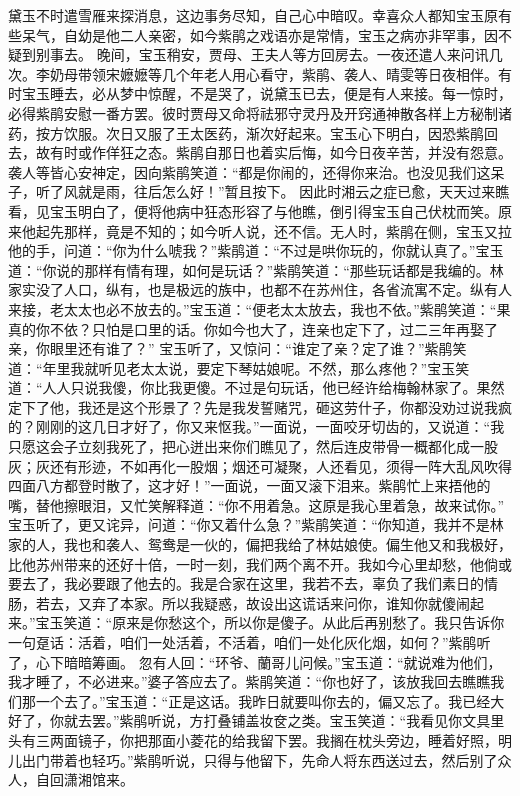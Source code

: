 \documentclass[12pt,oneside]{book}
\begin{document}
黛玉不时遣雪雁来探消息，这边事务尽知，自己心中暗叹。幸喜众人都知宝玉原有些呆气，自幼是他二人亲密，如今紫鹃之戏语亦是常情，宝玉之病亦非罕事，因不疑到别事去。
晚间，宝玉稍安，贾母、王夫人等方回房去。一夜还遣人来问讯几次。李奶母带领宋嬷嬷等几个年老人用心看守，紫鹃、袭人、晴雯等日夜相伴。有时宝玉睡去，必从梦中惊醒，不是哭了，说黛玉已去，便是有人来接。每一惊时，必得紫鹃安慰一番方罢。彼时贾母又命将祛邪守灵丹及开窍通神散各样上方秘制诸药，按方饮服。次日又服了王太医药，渐次好起来。宝玉心下明白，因恐紫鹃回去，故有时或作佯狂之态。紫鹃自那日也着实后悔，如今日夜辛苦，并没有怨意。袭人等皆心安神定，因向紫鹃笑道：“都是你闹的，还得你来治。也没见我们这呆子，听了风就是雨，往后怎么好！”暂且按下。
因此时湘云之症已愈，天天过来瞧看，见宝玉明白了，便将他病中狂态形容了与他瞧，倒引得宝玉自己伏枕而笑。原来他起先那样，竟是不知的；如今听人说，还不信。无人时，紫鹃在侧，宝玉又拉他的手，问道：“你为什么唬我？”紫鹃道：“不过是哄你玩的，你就认真了。”宝玉道：“你说的那样有情有理，如何是玩话？”紫鹃笑道：“那些玩话都是我编的。林家实没了人口，纵有，也是极远的族中，也都不在苏州住，各省流寓不定。纵有人来接，老太太也必不放去的。”宝玉道：“便老太太放去，我也不依。”紫鹃笑道：“果真的你不依？只怕是口里的话。你如今也大了，连亲也定下了，过二三年再娶了亲，你眼里还有谁了？”
宝玉听了，又惊问：“谁定了亲？定了谁？”紫鹃笑道：“年里我就听见老太太说，要定下琴姑娘呢。不然，那么疼他？”宝玉笑道：“人人只说我傻，你比我更傻。不过是句玩话，他已经许给梅翰林家了。果然定下了他，我还是这个形景了？先是我发誓赌咒，砸这劳什子，你都没劝过说我疯的？刚刚的这几日才好了，你又来怄我。”一面说，一面咬牙切齿的，又说道：“我只愿这会子立刻我死了，把心迸出来你们瞧见了，然后连皮带骨一概都化成一股灰；灰还有形迹，不如再化一股烟；烟还可凝聚，人还看见，须得一阵大乱风吹得四面八方都登时散了，这才好！”一面说，一面又滚下泪来。紫鹃忙上来捂他的嘴，替他擦眼泪，又忙笑解释道：“你不用着急。这原是我心里着急，故来试你。”
宝玉听了，更又诧异，问道：“你又着什么急？”紫鹃笑道：“你知道，我并不是林家的人，我也和袭人、鸳鸯是一伙的，偏把我给了林姑娘使。偏生他又和我极好，比他苏州带来的还好十倍，一时一刻，我们两个离不开。我如今心里却愁，他倘或要去了，我必要跟了他去的。我是合家在这里，我若不去，辜负了我们素日的情肠，若去，又弃了本家。所以我疑惑，故设出这谎话来问你，谁知你就傻闹起来。”宝玉笑道：“原来是你愁这个，所以你是傻子。从此后再别愁了。我只告诉你一句趸话：活着，咱们一处活着，不活着，咱们一处化灰化烟，如何？”紫鹃听了，心下暗暗筹画。
忽有人回：“环爷、蘭哥儿问候。”宝玉道：“就说难为他们，我才睡了，不必进来。”婆子答应去了。紫鹃笑道：“你也好了，该放我回去瞧瞧我们那一个去了。”宝玉道：“正是这话。我昨日就要叫你去的，偏又忘了。我已经大好了，你就去罢。”紫鹃听说，方打叠铺盖妆奁之类。宝玉笑道：“我看见你文具里头有三两面镜子，你把那面小菱花的给我留下罢。我搁在枕头旁边，睡着好照，明儿出门带着也轻巧。”紫鹃听说，只得与他留下，先命人将东西送过去，然后别了众人，自回潇湘馆来。
\end{document}
